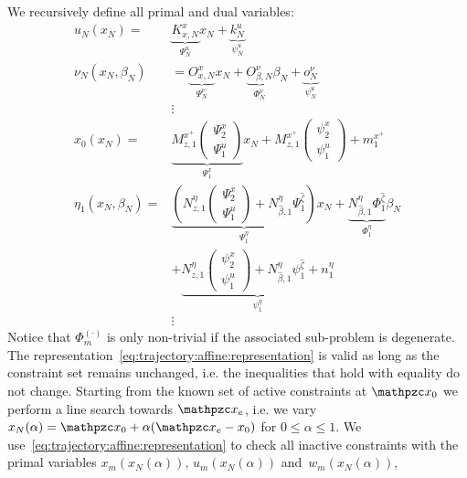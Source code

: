 \documentclass{ifacconf}
\begin{document}
We recursively define all primal and dual variables:
\begin{equation}\label{eq:trajectory:affine:representation}
	\begin{split}
		u_N(x_N) =& \underbrace{K_{x,N}^x}_{\Psi_N^u} x_N + \underbrace{k_N^u}_{\psi_N^u}\\
		\nu_N(x_N,\beta_N) &= \underbrace{O_{x,N}^x}_{\Psi_N^\nu} x_N + \underbrace{O_{\beta,N}^\nu}_{\Phi_N^\nu} \beta_N + 
		\underbrace{o_N^\nu}_{\psi_N^u}\\
		&\vdots \\
		x_0(x_N) =& \underbrace{M_{z,1}^{x^+}\left(\begin{array}{c} \Psi_2^x \\ \Psi_1^u \end{array}\right)}_{\Psi_1^x}x_N + 
		M_{z,1}^{x^+}\left(\begin{array}{c} \psi_2^x \\ \psi_1^u \end{array}\right) + m_1^{x^+}\\
		\eta_1(x_N,\beta_N) =& \underbrace{\left(N_{z,1}^{\eta}\left(\begin{array}{c} \Psi_2^x \\ \Psi_1^u \end{array}\right) + 
		N_{\hat\beta,1}^\eta \Psi_1^{\hat\zeta}\right)}_{\Psi_1^\eta}x_N + \underbrace{N_{\hat\beta,1}^\eta \Phi_1^{\hat\zeta}}_{\Phi_1^\eta} \beta_N\\
		&+\underbrace{N_{z,1}^{\eta}\left(\begin{array}{c} \psi_2^x \\ \psi_1^u \end{array}\right) + 
		N_{\hat\beta,1}^\eta \psi_1^{\hat\zeta} + n_1^\eta}_{\psi_1^\eta}\\
		&\vdots
	\end{split}
\end{equation}
Notice that $\Phi^{(\cdot)}_m$ is only non-trivial if the associated sub-problem is degenerate. The 
representation~\eqref{eq:trajectory:affine:representation} is valid as long as the constraint set remains unchanged, 
i.e. the inequalities that hold with equality do not change. Starting from the known set of active constraints at
$\mathpzc x_0$ we perform a line search towards $\mathpzc x_e$, i.e. we vary $x_N(\alpha)=\mathpzc x_0+
\alpha(\mathpzc x_e-x_0)$ for $0\leq\alpha\leq1$. We use~\eqref{eq:trajectory:affine:representation} to
check all inactive constraints with the primal variables $x_m(x_N(\alpha)),\, u_m(x_N(\alpha))$ and~$w_m(x_N(\alpha))$,
\end{document}
